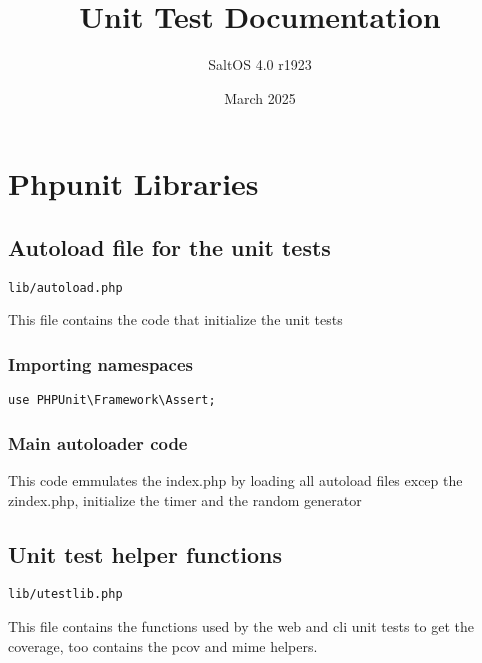 \documentclass[a4paper]{article}
\title{Unit Test Documentation}
\author{SaltOS 4.0 r1923}
\begin{document}
\date{March 2025}
\maketitle
\clearpage

\tableofcontents
\clearpage


\hypertarget{toc1}{}
\section{Phpunit Libraries}

\hypertarget{toc2}{}
\subsection{Autoload file for the unit tests}

\begin{lstlisting}
lib/autoload.php
\end{lstlisting}

This file contains the code that initialize the unit tests

\hypertarget{toc3}{}
\subsubsection{Importing namespaces}

\begin{lstlisting}
use PHPUnit\Framework\Assert;
\end{lstlisting}

\hypertarget{toc4}{}
\subsubsection{Main autoloader code}

This code emmulates the index.php by loading all autoload files excep
the zindex.php, initialize the timer and the random generator

\hypertarget{toc5}{}
\subsection{Unit test helper functions}

\begin{lstlisting}
lib/utestlib.php
\end{lstlisting}

This file contains the functions used by the web and cli unit tests
to get the coverage, too contains the pcov and mime helpers.

\hypertarget{toc6}{}
\end{document}
